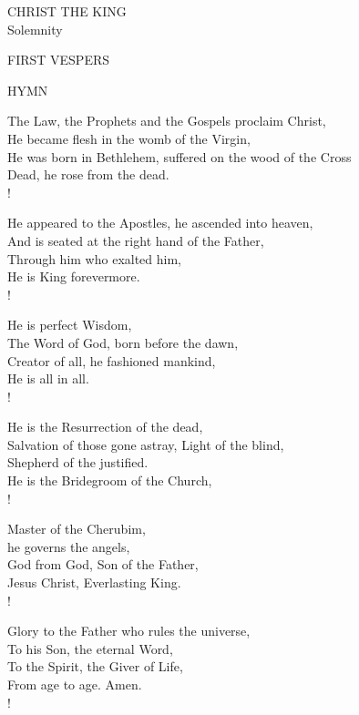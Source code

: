 \begin{center}\normalsize CHRIST THE KING\\
\footnotesize Solemnity\\
\end{center}

\begin{flushleft}\normalsize FIRST VESPERS\\\end{flushleft}

\noindent\small{\uppercase{Hymn}}\normalsize
\begin{cverse}
The Law, the Prophets and the Gospels proclaim Christ,\\
He became flesh in the womb of the Virgin,\\
He was born in Bethlehem, suffered on the wood of the Cross\\
Dead, he rose from the dead.\\!

He appeared to the Apostles, he ascended into heaven,\\
And is seated at the right hand of the Father,\\
Through him who exalted him,\\
He is King forevermore.\\!

He is perfect Wisdom,\\
The Word of God, born before the dawn,\\
Creator of all, he fashioned mankind,\\
He is all in all.\\!

He is the Resurrection of the dead,\\
Salvation of those gone astray, Light of the blind,\\
Shepherd of the justified.\\
He is the Bridegroom of the Church,\\!

Master of the Cherubim, \\
he governs the angels,\\
God from God, Son of the Father,\\
Jesus Christ, Everlasting King.\\!

Glory to the Father who rules the universe,\\
To his Son, the eternal Word,\\
To the Spirit, the Giver of Life,\\
From age to age. Amen.\\!
\end{cverse}

